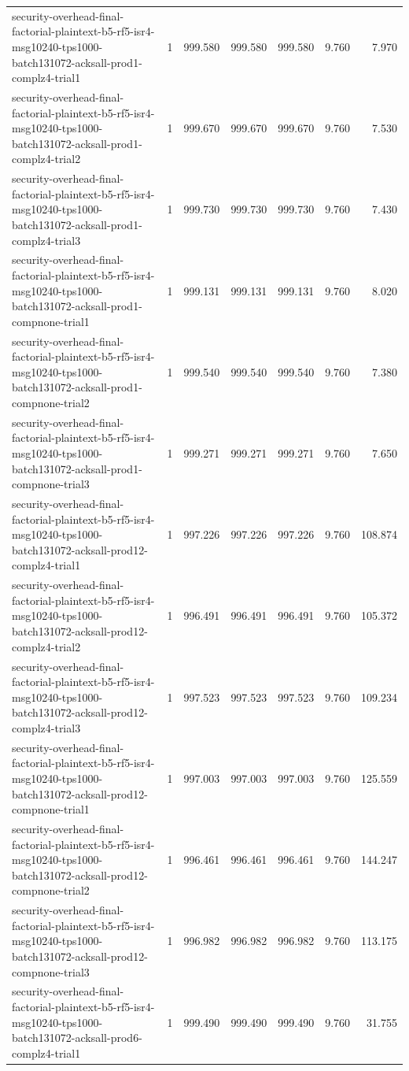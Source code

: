\begin{tabular}{lrrrrrr}
security-overhead-final-factorial-plaintext-b5-rf5-isr4-msg10240-tps1000-batch131072-acksall-prod1-complz4-trial1 & 1 & 999.580 & 999.580 & 999.580 & 9.760 & 7.970 \\
security-overhead-final-factorial-plaintext-b5-rf5-isr4-msg10240-tps1000-batch131072-acksall-prod1-complz4-trial2 & 1 & 999.670 & 999.670 & 999.670 & 9.760 & 7.530 \\
security-overhead-final-factorial-plaintext-b5-rf5-isr4-msg10240-tps1000-batch131072-acksall-prod1-complz4-trial3 & 1 & 999.730 & 999.730 & 999.730 & 9.760 & 7.430 \\
security-overhead-final-factorial-plaintext-b5-rf5-isr4-msg10240-tps1000-batch131072-acksall-prod1-compnone-trial1 & 1 & 999.131 & 999.131 & 999.131 & 9.760 & 8.020 \\
security-overhead-final-factorial-plaintext-b5-rf5-isr4-msg10240-tps1000-batch131072-acksall-prod1-compnone-trial2 & 1 & 999.540 & 999.540 & 999.540 & 9.760 & 7.380 \\
security-overhead-final-factorial-plaintext-b5-rf5-isr4-msg10240-tps1000-batch131072-acksall-prod1-compnone-trial3 & 1 & 999.271 & 999.271 & 999.271 & 9.760 & 7.650 \\
security-overhead-final-factorial-plaintext-b5-rf5-isr4-msg10240-tps1000-batch131072-acksall-prod12-complz4-trial1 & 1 & 997.226 & 997.226 & 997.226 & 9.760 & 108.874 \\
security-overhead-final-factorial-plaintext-b5-rf5-isr4-msg10240-tps1000-batch131072-acksall-prod12-complz4-trial2 & 1 & 996.491 & 996.491 & 996.491 & 9.760 & 105.372 \\
security-overhead-final-factorial-plaintext-b5-rf5-isr4-msg10240-tps1000-batch131072-acksall-prod12-complz4-trial3 & 1 & 997.523 & 997.523 & 997.523 & 9.760 & 109.234 \\
security-overhead-final-factorial-plaintext-b5-rf5-isr4-msg10240-tps1000-batch131072-acksall-prod12-compnone-trial1 & 1 & 997.003 & 997.003 & 997.003 & 9.760 & 125.559 \\
security-overhead-final-factorial-plaintext-b5-rf5-isr4-msg10240-tps1000-batch131072-acksall-prod12-compnone-trial2 & 1 & 996.461 & 996.461 & 996.461 & 9.760 & 144.247 \\
security-overhead-final-factorial-plaintext-b5-rf5-isr4-msg10240-tps1000-batch131072-acksall-prod12-compnone-trial3 & 1 & 996.982 & 996.982 & 996.982 & 9.760 & 113.175 \\
security-overhead-final-factorial-plaintext-b5-rf5-isr4-msg10240-tps1000-batch131072-acksall-prod6-complz4-trial1 & 1 & 999.490 & 999.490 & 999.490 & 9.760 & 31.755 \\

\end{tabular}
